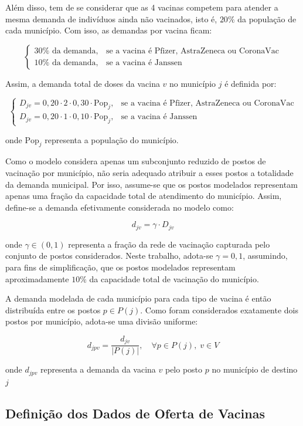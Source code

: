 Além disso, tem de se considerar que as 4 vacinas competem para atender a mesma demanda de indivíduos ainda não vacinados, isto é, $20\%$ da população de cada município. Com isso, as demandas por vacina ficam:

\[
\begin{cases}
30\% \text{ da demanda}, & \text{se a vacina é Pfizer, AstraZeneca ou CoronaVac} \\
10\% \text{ da demanda}, & \text{se a vacina é Janssen}
\end{cases}
\]

Assim, a demanda total de doses da vacina $v$ no município $j$ é definida por:

\[
\begin{cases}
D_{jv} = 0,20 \cdot 2 \cdot 0,30 \cdot \text{Pop}_j, & \text{se a vacina é Pfizer, AstraZeneca ou CoronaVac} \\
D_{jv} = 0,20 \cdot 1 \cdot 0,10 \cdot \text{Pop}_j, & \text{se a vacina é Janssen}
\end{cases}
\]

onde $\text{Pop}_j$ representa a população do município.

Como o modelo considera apenas um subconjunto reduzido de postos de vacinação por município, não seria adequado atribuir a esses postos a totalidade da demanda municipal. Por isso, assume-se que os postos modelados representam apenas uma fração da capacidade total de atendimento do município. Assim, define-se a demanda efetivamente considerada no modelo como:

\[
d_{jv} = \gamma \cdot D_{jv}
\]

onde $\gamma \in (0,1)$ representa a fração da rede de vacinação capturada pelo conjunto de postos considerados. Neste trabalho, adota-se $\gamma = 0{,}1$, assumindo, para fins de simplificação, que os postos modelados representam aproximadamente $10\%$ da capacidade total de vacinação do município.

A demanda modelada de cada município para cada tipo de vacina é então distribuída entre os postos $p \in P(j)$. Como foram considerados exatamente dois postos por município, adota-se uma divisão uniforme:

\[
d_{jpv} = \frac{d_{jv}}{|P(j)|}, \quad \forall p \in P(j),\; v \in V
\]

onde  $d_{jpv}$ representa a demanda da vacina $v$ pelo posto $p$ no município de destino $j$



\subsection{Definição dos Dados de Oferta de Vacinas}

